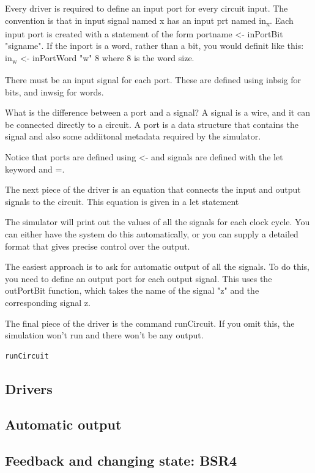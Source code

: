 \documentclass[]{svmono}
\begin{document}
Every driver is required to define an input port for every circuit
input.  The convention is that in input signal named x has an
input prt named in\textsubscript{x}.  Each input port is created with a statement
of the form portname <- inPortBit "signame".  If the inport is a
word, rather than a bit, you would definit like this: in\textsubscript{w} <-
inPortWord "w" 8 where 8 is the word size.

There must be an input signal for each port.  These are defined
using inbsig for bits, and inwsig for words.

What is the difference between a port and a signal?  A signal is a
wire, and it can be connected directly to a circuit.  A port is a
data structure that contains the signal and also some addiitonal
metadata required by the simulator.

Notice that ports are defined using <- and signals are defined
with the let keyword and =.

The next piece of the driver is an equation that connects the
input and output signals to the circuit.  This equation is given
in a let statement

The simulator will print out the values of all the signals for
each clock cycle.  You can either have the system do this
automatically, or you can supply a detailed format that gives
precise control over the output.

The easiest approach is to ask for automatic output of all the
signals.  To do this, you need to define an output port for each
output signal.  This uses the outPortBit function, which takes the
name of the signal "z" and the corresponding signal z.

The final piece of the driver is the command runCircuit.  If
you omit this, the simulation won't run and there won't be any
output.

\begin{verbatim}
runCircuit
\end{verbatim}
\subsection*{Drivers}
\label{sec:org3bca2c0}
\subsection*{Automatic output}
\label{sec:org41a393a}

\subsection*{Feedback and changing state: BSR4}
\label{sec:orgff15298}
\end{document}
